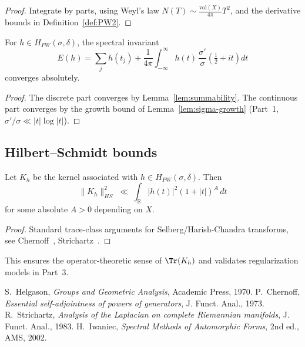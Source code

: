 \begin{proof}
Integrate by parts, using Weyl’s law $N(T)\sim \tfrac{\mathrm{vol}(X)}{4\pi}T^2$, 
and the derivative bounds in Definition~\ref{def:PW2}.
\end{proof}

\begin{theorem}
\label{thm:abs-sum}
For $h\in H_{PW}(\sigma,\delta)$, the spectral invariant
\[
E(h) = \sum_j h(t_j) + \frac{1}{4\pi}\int_{-\infty}^\infty h(t)\,\frac{\sigma'}{\sigma}\!\left(\tfrac12+it\right)dt
\]
converges absolutely.
\end{theorem}

\begin{proof}
The discrete part converges by Lemma~\ref{lem:summability}.
The continuous part converges by the growth bound of Lemma~\ref{lem:sigma-growth}
(Part~1, $\sigma'/\sigma \ll |t|\log|t|$).
\end{proof}

\subsection{Hilbert–Schmidt bounds}

\begin{proposition}
\label{prop:HS}
Let $K_h$ be the kernel associated with $h\in H_{PW}(\sigma,\delta)$. Then
\[
\|K_h\|_{HS}^2 \;\ll\; \int_{\mathbb{R}} |h(t)|^2(1+|t|)^A\,dt
\]
for some absolute $A>0$ depending on $X$.
\end{proposition}

\begin{proof}
Standard trace-class arguments for Selberg/Harish-Chandra transforms,
see Chernoff~\cite{Chernoff1973}, Strichartz~\cite{Strichartz1983}.
\end{proof}

\begin{remark}
This ensures the operator-theoretic sense of $\Tr(K_h)$ 
and validates regularization models in Part~3.
\end{remark}

\begin{thebibliography}{9}
 S.~Helgason, \emph{Groups and Geometric Analysis}, Academic Press, 1970.
 P.~Chernoff, \emph{Essential self-adjointness of powers of generators}, J. Funct. Anal., 1973.
 R.~Strichartz, \emph{Analysis of the Laplacian on complete Riemannian manifolds}, J. Funct. Anal., 1983.
 H.~Iwaniec, \emph{Spectral Methods of Automorphic Forms}, 2nd ed., AMS, 2002.
\end{thebibliography}


